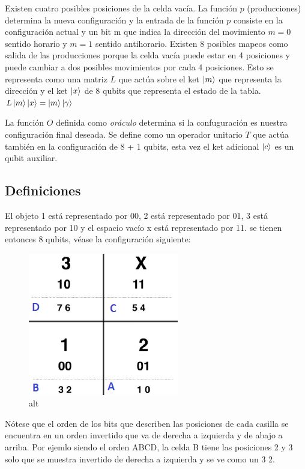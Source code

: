 \documentclass[11pt]{article}
\begin{document}
Existen cuatro posibles posiciones de la celda vacía. La función \(p\)
(producciones) determina la nueva configuración y la entrada de la
función \(p\) consiste en la configuración actual y un bit m que indica
la dirección del movimiento \(m=0\) sentido horario y \(m=1\) sentido
antihorario. Existen 8 posibles mapeos como salida de las producciones
porque la celda vacía puede estar en 4 posiciones y puede cambiar a dos
posibles movimientos por cada 4 posiciones. Esto se representa como una
matriz \(L\) que actúa sobre el ket \(\ket{m}\) que representa la
dirección y el ket \(\ket{x}\) de 8 qubits que representa el estado de
la tabla. \(L \ket{m}\ket{x} = \ket{m}\ket{\gamma}\)

La función \(O\) definida como \emph{oráculo} determina si la
confuguración es nuestra configuración final deseada. Se define como un
operador unitario \(T\) que actúa también en la configuración de 8 + 1
qubits, esta vez el ket adicional \(\ket{c}\) es un qubit auxiliar.

    \hypertarget{definiciones}{%
\subsection{Definiciones}\label{definiciones}}

El objeto 1 está representado por 00, 2 está representado por 01, 3 está
representado por 10 y el espacio vacío x está representado por 11. se
tienen entonces 8 qubits, véase la configuración siguiente:

\begin{figure}
\centering
\includegraphics{config2puzzle.png}
\caption{alt}
\end{figure}

Nótese que el orden de los bits que describen las posiciones de cada
casilla se encuentra en un orden invertido que va de derecha a izquierda
y de abajo a arriba. Por ejemlo siendo el orden ABCD, la celda B tiene
las posiciones 2 y 3 solo que se muestra invertido de derecha a
izquierda y se ve como un 3 2.
\end{document}
